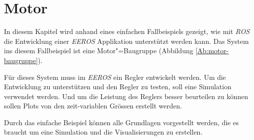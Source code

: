 \chapter{Motor}


In diesem Kapitel wird anhand eines einfachen Fallbeispiels gezeigt, wie mit \textit{ROS} die Entwicklung einer \textit{EEROS} Applikation unterstützt werden kann. 
Das System ins diesem Fallbeispiel ist eine Motor"=Baugruppe (Abbildung \ref{Ab:motor-baugruppe}).

Für dieses System muss im \textit{EEROS} ein Regler entwickelt werden.
Um die Entwicklung zu unterstützen und den Regler zu testen, soll eine Simulation verwendet werden.
Und um die Leistung des Reglers besser beurteilen zu können sollen Plots von den zeit-variablen Grössen erstellt werden.


Durch das einfache Beispiel können alle Grundlagen vorgestellt werden, die es braucht um eine Simulation und die Visualisierungen zu erstellen.


